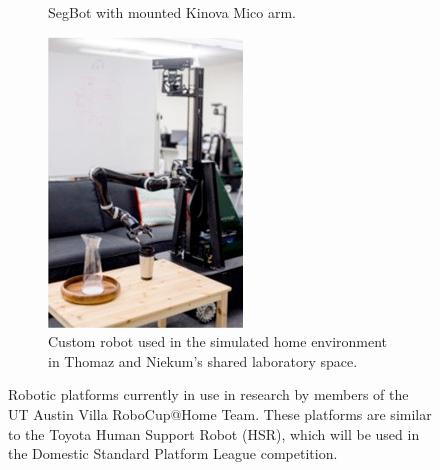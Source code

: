 \documentclass[runningheads,a4paper]{llncs}
\begin{document}
\begin{figure}
\begin{subfigure}[t]{1.4in}
		\caption{SegBot with mounted Kinova Mico arm.}\label{fig:1b}
	\end{subfigure}
	\quad
	\begin{subfigure}[t]{1.4in}
		\centering
        \includegraphics[width=\textwidth]{images/ut_poli.jpg}
		\caption{Custom robot used in the simulated home environment in Thomaz and Niekum's shared laboratory space.}\label{fig:1c}
	\end{subfigure}
	\caption{Robotic platforms currently in use in research by members of the UT Austin Villa RoboCup@Home Team. These platforms are similar to the Toyota Human Support Robot (HSR), which will be used in the Domestic Standard Platform League competition.}\label{fig:1}
\end{figure}
\end{document}
